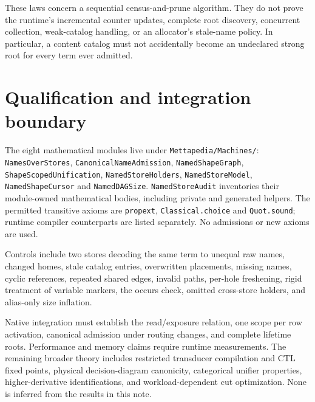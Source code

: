 \documentclass[11pt,a4paper]{article}
\newcommand{\code}[1]{\nolinkurl{#1}}
\begin{document}
These laws concern a sequential census-and-prune algorithm. They do not prove
the runtime's incremental counter updates, complete root discovery,
concurrent collection, weak-catalog handling, or an allocator's stale-name
policy. In particular, a content catalog must not accidentally become an
undeclared strong root for every term ever admitted.

\section{Qualification and integration boundary}

The eight mathematical modules live under
\code{Mettapedia/Machines/}: \code{NamesOverStores},
\code{CanonicalNameAdmission}, \code{NamedShapeGraph},
\code{ShapeScopedUnification}, \code{NamedStoreHolders},
\code{NamedStoreModel}, \code{NamedShapeCursor} and \code{NamedDAGSize}.
\code{NamedStoreAudit} inventories their module-owned mathematical bodies,
including private and generated helpers. The permitted transitive axioms are
\code{propext}, \code{Classical.choice} and \code{Quot.sound}; runtime compiler
counterparts are listed separately. No admissions or new axioms are used.

Controls include two stores decoding the same term to unequal raw names,
changed homes, stale catalog entries, overwritten placements, missing names,
cyclic references, repeated shared edges, invalid paths, per-hole freshening,
rigid treatment of variable markers, the occurs check, omitted cross-store
holders, and alias-only size inflation.

Native integration must establish the read/exposure relation, one scope per
row activation, canonical admission under routing changes, and complete
lifetime roots. Performance and memory claims require runtime measurements.
The remaining broader theory includes restricted transducer compilation and
CTL fixed points, physical decision-diagram canonicity, categorical unifier
properties, higher-derivative identifications, and workload-dependent cut
optimization. None is inferred from the results in this note.
\end{document}
